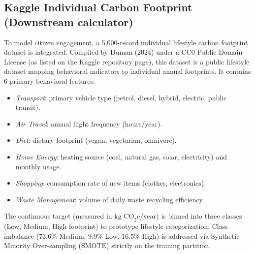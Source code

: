 \documentclass[conference]{IEEEtran}
\begin{document}
\subsection{Kaggle Individual Carbon Footprint (Downstream calculator)}
To model citizen engagement, a 5{,}000-record individual lifestyle carbon footprint dataset \cite{kaggle_carbon} is integrated. Compiled by Duman (2024) under a CC0 Public Domain License (as listed on the Kaggle repository page), this dataset is a public lifestyle dataset mapping behavioral indicators to individual annual footprints. It contains 6 primary behavioral features:
\begin{itemize}
    \item \textit{Transport}: primary vehicle type (petrol, diesel, hybrid, electric, public transit).
    \item \textit{Air Travel}: annual flight frequency (hours/year).
    \item \textit{Diet}: dietary footprint (vegan, vegetarian, omnivore).
    \item \textit{Home Energy}: heating source (coal, natural gas, solar, electricity) and monthly usage.
    \item \textit{Shopping}: consumption rate of new items (clothes, electronics).
    \item \textit{Waste Management}: volume of daily waste recycling efficiency.
\end{itemize}
The continuous target (measured in $\text{kg CO}_2\text{e}/\text{year}$) is binned into three classes (Low, Medium, High footprint) to prototype lifestyle categorization. Class imbalance (73.6\% Medium, 9.9\% Low, 16.5\% High) is addressed via Synthetic Minority Over-sampling (SMOTE) strictly on the training partition.

\begin{table}[h]
\caption{Dataset Summary}
\label{tab:datasets}
\centering
\scriptsize
{}
\end{table}
\end{document}
